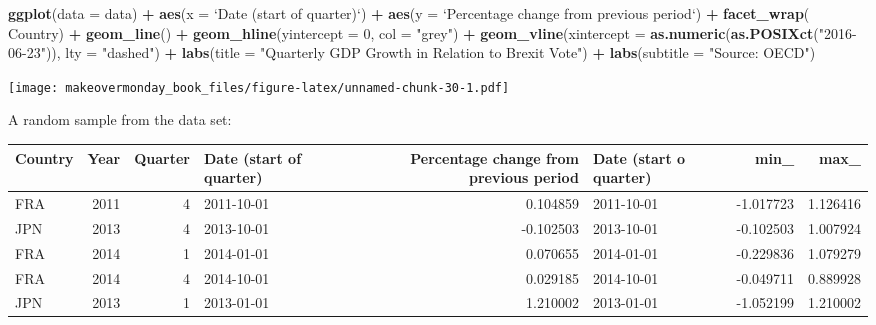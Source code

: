 \documentclass[]{book}
\newenvironment{Shaded}{\begin{snugshade}}{\end{snugshade}}
\newcommand{\KeywordTok}[1]{\textcolor[rgb]{0.13,0.29,0.53}{\textbf{#1}}}
\newcommand{\DataTypeTok}[1]{\textcolor[rgb]{0.13,0.29,0.53}{#1}}
\newcommand{\DecValTok}[1]{\textcolor[rgb]{0.00,0.00,0.81}{#1}}
\newcommand{\StringTok}[1]{\textcolor[rgb]{0.31,0.60,0.02}{#1}}
\newcommand{\OperatorTok}[1]{\textcolor[rgb]{0.81,0.36,0.00}{\textbf{#1}}}
\newcommand{\NormalTok}[1]{#1}
\theoremstyle{definition}
\theoremstyle{definition}
\theoremstyle{definition}
\theoremstyle{remark}
\begin{document}
\begin{Shaded}
\begin{Highlighting}[]
\KeywordTok{ggplot}\NormalTok{(}\DataTypeTok{data =}\NormalTok{ data) }\OperatorTok{+}
\StringTok{  }\KeywordTok{aes}\NormalTok{(}\DataTypeTok{x =} \StringTok{`}\DataTypeTok{Date (start of quarter)}\StringTok{`}\NormalTok{) }\OperatorTok{+}
\StringTok{  }\KeywordTok{aes}\NormalTok{(}\DataTypeTok{y =} \StringTok{`}\DataTypeTok{Percentage change from previous period}\StringTok{`}\NormalTok{) }\OperatorTok{+}
\StringTok{  }\KeywordTok{facet_wrap}\NormalTok{(}\OperatorTok{~}\StringTok{ }\NormalTok{Country) }\OperatorTok{+}
\StringTok{  }\KeywordTok{geom_line}\NormalTok{() }\OperatorTok{+}
\StringTok{  }\KeywordTok{geom_hline}\NormalTok{(}\DataTypeTok{yintercept =} \DecValTok{0}\NormalTok{, }\DataTypeTok{col =} \StringTok{"grey"}\NormalTok{) }\OperatorTok{+}
\StringTok{  }\KeywordTok{geom_vline}\NormalTok{(}\DataTypeTok{xintercept =} \KeywordTok{as.numeric}\NormalTok{(}\KeywordTok{as.POSIXct}\NormalTok{(}\StringTok{"2016-06-23"}\NormalTok{)), }\DataTypeTok{lty =} \StringTok{"dashed"}\NormalTok{) }\OperatorTok{+}
\StringTok{  }\KeywordTok{labs}\NormalTok{(}\DataTypeTok{title =} \StringTok{"Quarterly GDP Growth in Relation to Brexit Vote"}\NormalTok{) }\OperatorTok{+}
\StringTok{  }\KeywordTok{labs}\NormalTok{(}\DataTypeTok{subtitle =} \StringTok{"Source: OECD"}\NormalTok{)}
\end{Highlighting}
\end{Shaded}

\texttt{[image: makeovermonday\_book\_files/figure-latex/unnamed-chunk-30-1.pdf]}

A random sample from the data set:

\begin{tabular}{l|r|r|l|r|l|r|r}
\hline
Country & Year & Quarter & Date (start of quarter) & Percentage change from previous period & Date (start o quarter) & min\_ & max\_\\
\hline
FRA & 2011 & 4 & 2011-10-01 & 0.104859 & 2011-10-01 & -1.017723 & 1.126416\\
\hline
JPN & 2013 & 4 & 2013-10-01 & -0.102503 & 2013-10-01 & -0.102503 & 1.007924\\
\hline
FRA & 2014 & 1 & 2014-01-01 & 0.070655 & 2014-01-01 & -0.229836 & 1.079279\\
\hline
FRA & 2014 & 4 & 2014-10-01 & 0.029185 & 2014-10-01 & -0.049711 & 0.889928\\
\hline
JPN & 2013 & 1 & 2013-01-01 & 1.210002 & 2013-01-01 & -1.052199 & 1.210002\\
\hline
\end{tabular}
\end{document}
